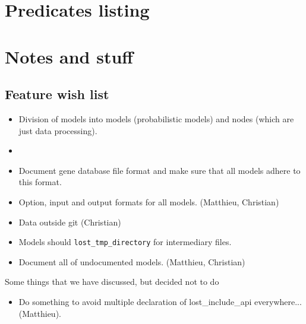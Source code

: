 \documentclass{book}
\begin{document}
\chapter{Predicates listing}



\chapter{Notes and stuff}

\section{Feature wish list}

\begin{itemize}

\item Division of models into models (probabilistic models) and nodes
  (which are just data processing).

\item 

\item Document gene database file format and make sure that all models
  adhere to this format.

\item Option, input and output formats for all models. (Matthieu, Christian)

\item Data outside git (Christian)

\item Models should \texttt{lost\_tmp\_directory} for intermediary
  files. 

\item Document all of undocumented models. (Matthieu, Christian)

\end{itemize}

Some things that we have discussed, but  decided not to do
\begin{itemize}
\item Do something to avoid multiple declaration of lost\_include\_api
 everywhere... (Matthieu).
\end{itemize}

\printindex
\end{document}
